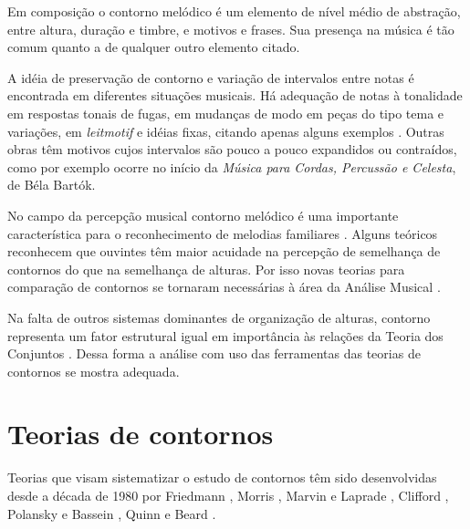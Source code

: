 \documentclass{article}
\newcommand{\eng}[1]{\textit{#1}}
\newcommand{\opus}[1]{\textit{#1}}
\begin{document}
Em composição o contorno melódico é um elemento de nível médio de
abstração, entre altura, duração e timbre, e motivos e frases. Sua
presença na música é tão comum quanto a de qualquer outro elemento
citado.

A idéia de preservação de contorno e variação de intervalos entre
notas é encontrada em diferentes situações musicais. Há adequação de
notas à tonalidade em respostas tonais de fugas, em mudanças de modo
em peças do tipo tema e variações, em \eng{leitmotif} e idéias fixas,
citando apenas alguns exemplos
\cite[p. 29]{morris87:composition}. Outras obras têm motivos cujos
intervalos são pouco a pouco expandidos ou contraídos, como por
exemplo ocorre no início da \opus{Música para Cordas, Percussão e
  Celesta}, de Béla Bartók.

No campo da percepção musical contorno melódico é uma importante
característica para o reconhecimento de melodias familiares
\cite[p. 136]{dowling.ea86:music}. Alguns teóricos reconhecem que
ouvintes têm maior acuidade na percepção de semelhança de contornos do
que na semelhança de alturas. Por isso novas teorias para comparação
de contornos se tornaram necessárias à área da Análise Musical
\cite[p. 226]{marvin.ea87:relating}.


Na falta de outros sistemas dominantes de organização de alturas,
contorno representa um fator estrutural igual em importância às
relações da Teoria dos Conjuntos \cite[p. 157]{clifford95:contour}.
Dessa forma a análise com uso das ferramentas das teorias de contornos
se mostra adequada.



\section{Teorias de contornos}
\label{sec:teorias-de-contornos}

Teorias que visam sistematizar o estudo de contornos têm sido
desenvolvidas desde a década de 1980 por Friedmann
\citeyear{friedmann85:methodology,friedmann87:response}, Morris
\citeyear{morris87:composition,morris93:directions}, Marvin e Laprade
\citeyear{marvin.ea87:relating}, Clifford
\citeyear{clifford95:contour}, Polansky e Bassein
\citeyear{polansky.ea92:possible}, Quinn \citeyear{quinn97:fuzzy} e
Beard \citeyear{beard03:contour}.
\end{document}
